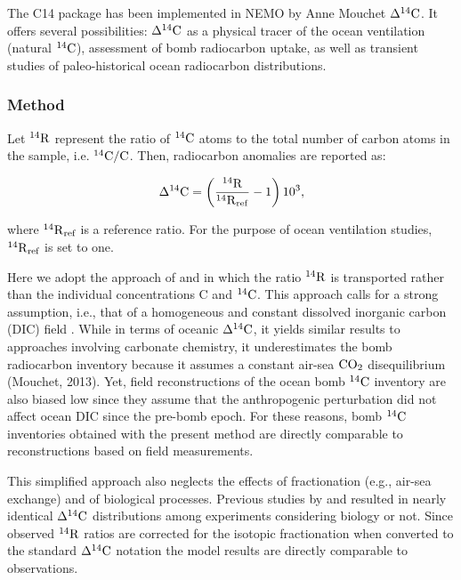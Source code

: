 \documentclass[../main/TOP_manual]{subfiles}
\begin{document}
The C14 package has been implemented in NEMO by Anne Mouchet $\Delta ^{14}\mathrm{C}$.
It offers several possibilities: $\Delta ^{14}\mathrm{C}$ as a physical tracer of the ocean ventilation (natural $\mathrm{^{14}C}$), assessment of bomb radiocarbon uptake, as well as transient studies of paleo-historical ocean radiocarbon distributions.

\subsubsection{Method}

Let  $\mathrm{^{14}{R}}$ represent the ratio of $\mathrm{^{14}C}$ atoms to the total number of carbon atoms in the sample, i.e. $\mathrm{^{14}C}/\mathrm{C}$.
Then, radiocarbon anomalies are reported as:

\begin{equation}
\Delta ^{14}\mathrm{C} = \left( \frac{\mathrm{^{14}{R}}}{\mathrm{^{14}{R}}_\mathrm{ref}} - 1 \right) 10^3, \label{eq:c14dcq}
\end{equation}

where $\mathrm{^{14}{R}}_{\textrm{ref}}$ is a reference ratio.
For the purpose of ocean ventilation studies, $\mathrm{^{14}{R}}_{\textrm{ref}}$ is set to one.

Here we adopt the approach of \cite{fiadeiro_1982} and \cite{toggweiler_1989a,toggweiler_1989b} in which  the ratio $\mathrm{^{14}{R}}$ is transported rather than the individual concentrations C and $\mathrm{^{14}C}$.
This approach calls for a strong assumption, i.e., that of a homogeneous and constant dissolved inorganic carbon (DIC) field \citep{toggweiler_1989a,mouchet_2013}.
While in terms of
oceanic $\Delta ^{14}\mathrm{C}$, it yields similar results to approaches involving carbonate chemistry, it underestimates the bomb radiocarbon inventory because it assumes a constant air-sea $\mathrm{CO_2}$ disequilibrium (Mouchet, 2013).
Yet, field reconstructions of the ocean bomb $\mathrm{^{14}C}$ inventory are also biased low \citep{naegler_2009} since they assume that the anthropogenic perturbation did not affect ocean DIC since the pre-bomb epoch.
For these reasons, bomb $\mathrm{^{14}C}$ inventories obtained with the present method are directly comparable to reconstructions based on field measurements.

This simplified approach also neglects the effects of fractionation (e.g.,  air-sea exchange) and of biological processes.
Previous studies by \cite{bacastow_1990} and \cite{joos_1997} resulted in nearly identical $\Delta ^{14}\mathrm{C}$ distributions among experiments considering biology or not.
Since observed $\mathrm{^{14}{R}}$ ratios are corrected for the isotopic fractionation when converted to the standard $\Delta ^{14}\mathrm{C}$ notation \citep{stuiver_1977} the model results are directly comparable to observations.
\end{document}
